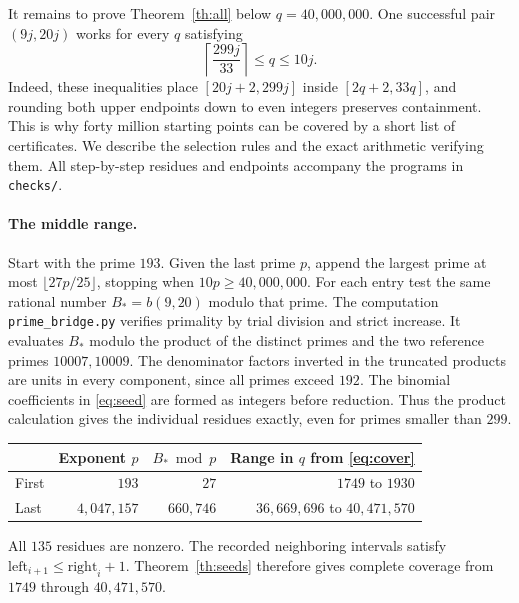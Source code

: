 \documentclass[11pt]{article}
\numberwithin{equation}{section}
\begin{document}
It remains to prove Theorem~\ref{th:all} below \(q=40{,}000{,}000\).
One successful pair \((9j,20j)\) works for every \(q\) satisfying
\begin{equation}\label{eq:cover}
                 \left\lceil\frac{299j}{33}\right\rceil
                          \le q\le 10j .
\end{equation}
Indeed, these inequalities place \([20j+2,299j]\) inside
\([2q+2,33q]\), and rounding both upper endpoints down to even integers
preserves containment. This is why forty million starting points can be
covered by a short list of certificates. We describe the selection
rules and the exact arithmetic verifying them. All step-by-step
residues and endpoints accompany the programs in \texttt{checks/}.

\paragraph{The middle range.}
Start with the prime \(193\). Given the last prime \(p\), append the
largest prime at most \(\lfloor27p/25\rfloor\), stopping when
\(10p\ge40{,}000{,}000\). For each entry test the same rational
number \(B_*=b(9,20)\) modulo that prime. The computation
\texttt{prime\_bridge.py} verifies primality by trial division and
strict increase. It evaluates \(B_*\) modulo the product of the
distinct primes and the two reference primes \(10007,10009\).
The denominator factors inverted in the truncated products are units
in every component, since all primes exceed \(192\). The binomial
coefficients in \eqref{eq:seed} are formed as integers before
reduction. Thus the product calculation gives the individual residues
exactly, even for primes smaller than \(299\).

\begin{center}
\begin{tabular}{@{}lrrr@{}}\toprule
& Exponent \(p\)& \(B_*\bmod p\)& Range in \(q\) from \eqref{eq:cover}\\\midrule
First & \(193\)&\(27\)& \(1749\) to \(1930\)\\
Last & \(4{,}047{,}157\)&\(660{,}746\)&
 \(36{,}669{,}696\) to \(40{,}471{,}570\)\\\bottomrule
\end{tabular}
\end{center}
All \(135\) residues are nonzero. The recorded neighboring intervals
satisfy \(\mathrm{left}_{i+1}\le\mathrm{right}_i+1\).
Theorem~\ref{th:seeds} therefore gives complete coverage from \(1749\)
through \(40{,}471{,}570\).
\end{document}
